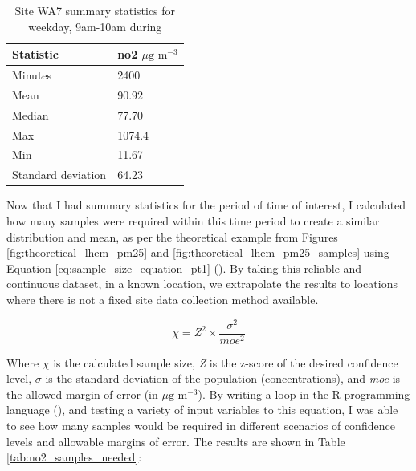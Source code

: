 \begin{table}[H]
\caption{Site WA7 summary statistics for weekday, 9am-10am during}
\centering
    \begin{tabular}{ | l | l |}
    \hline 
     \bfseries{Statistic}   & \bfseries{\gls{no2} $\mu \text{g m}^{-3}$}    \\ \hline
     Minutes                & 2400                                         \\ \hline
     Mean                   & 90.92                                        \\ \hline
     Median                 & 77.70                                        \\ \hline
     Max                    & 1074.4                                       \\ \hline
     Min                    & 11.67                                        \\ \hline
     Standard deviation     & 64.23                                        \\ \hline
    \end{tabular}
\label{tab:wa7_summary_stats}
\end{table}

Now that I had summary statistics for the period of time of interest, I calculated how many samples were required within this time period to create a similar distribution and mean, as per the theoretical example from Figures \ref{fig:theoretical_lhem_pm25} and \ref{fig:theoretical_lhem_pm25_samples} using Equation \ref{eq:sample_size_equation_pt1} (\cite{PennStateEberlyCollegeofScience2017}). By taking this reliable and continuous dataset, in a known location, we extrapolate the results to locations where there is not a fixed site data collection method available.

\begin{equation}
  \chi = \textit{Z}^2 \times \frac{\sigma^2}{moe^2} 
  \label{eq:sample_size_equation_pt1}
\end{equation}

Where $\chi$ is the calculated sample size, \textit{Z} is the z-score of the desired confidence level, $\sigma$ is the standard deviation of the population (concentrations), and \textit{moe} is the allowed margin of error (in $\mu \text{g m}^{-3}$). By writing a loop in the R programming language (\cite{RFoundationforStatisticalComputing2014}), and testing a variety of input variables to this equation, I was able to see how many samples would be required in different scenarios of confidence levels and allowable margins of error. The results are shown in Table \ref{tab:no2_samples_needed}:

